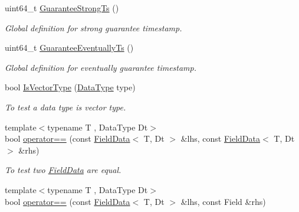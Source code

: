 \begin{DoxyCompactItemize}
\mbox{\label{namespacemilvus_adfce5db74c674b5ad863c7348197440e}} 
uint64\+\_\+t \hyperlink{namespacemilvus_adfce5db74c674b5ad863c7348197440e}{Guarantee\+Strong\+Ts} ()
\begin{DoxyCompactList}\small\item\em Global definition for strong guarantee timestamp. \end{DoxyCompactList}\item 
\mbox{\label{namespacemilvus_a6ef6eb309be61920d45c4394b3de6bf7}} 
uint64\+\_\+t \hyperlink{namespacemilvus_a6ef6eb309be61920d45c4394b3de6bf7}{Guarantee\+Eventually\+Ts} ()
\begin{DoxyCompactList}\small\item\em Global definition for eventually guarantee timestamp. \end{DoxyCompactList}\item 
\mbox{\label{namespacemilvus_a86c6786005938232a0289c47bab94005}} 
bool \hyperlink{namespacemilvus_a86c6786005938232a0289c47bab94005}{Is\+Vector\+Type} (\hyperlink{namespacemilvus_a3bdf02cc09dcb59a1e1d2f287d90788b}{Data\+Type} type)
\begin{DoxyCompactList}\small\item\em To test a data type is vector type. \end{DoxyCompactList}\item 
\mbox{\label{namespacemilvus_a8d4f13c82ef4bffd6547d5f316ec543b}} 
{\footnotesize template$<$typename T , Data\+Type Dt$>$ }\\bool \hyperlink{namespacemilvus_a8d4f13c82ef4bffd6547d5f316ec543b}{operator==} (const \hyperlink{classmilvus_1_1_field_data}{Field\+Data}$<$ T, Dt $>$ \&lhs, const \hyperlink{classmilvus_1_1_field_data}{Field\+Data}$<$ T, Dt $>$ \&rhs)
\begin{DoxyCompactList}\small\item\em To test two \hyperlink{classmilvus_1_1_field_data}{Field\+Data} are equal. \end{DoxyCompactList}\item 
\mbox{\label{namespacemilvus_ad06f82efe8a3fbe854463509fe1ace25}} 
{\footnotesize template$<$typename T , Data\+Type Dt$>$ }\\bool \hyperlink{namespacemilvus_ad06f82efe8a3fbe854463509fe1ace25}{operator==} (const \hyperlink{classmilvus_1_1_field_data}{Field\+Data}$<$ T, Dt $>$ \&lhs, const Field \&rhs)

\end{DoxyCompactItemize}

